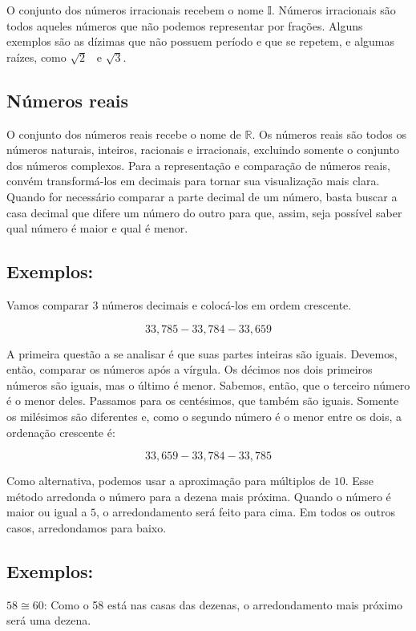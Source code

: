 O conjunto dos números irracionais recebem o nome 𝕀. Números irracionais
são todos aqueles números que não podemos representar por frações.
Alguns exemplos são as dízimas que não possuem período e que se repetem,
e algumas raízes, como $\sqrt{2}$ \ e $\sqrt{3}$.

\subsection{Números reais}

O conjunto dos números reais recebe o nome de $\mathbb{R}$. Os números reais são
todos os números naturais, inteiros, racionais e irracionais, excluindo
somente o conjunto dos números complexos. Para a representação e
comparação de números reais, convém transformá-los em decimais para
tornar sua visualização mais clara. Quando for necessário comparar a
parte decimal de um número, basta buscar a casa decimal que difere um
número do outro para que, assim, seja possível saber qual número é maior
e qual é menor.

\subsection{Exemplos:}

Vamos comparar 3 números decimais e colocá-los em ordem crescente.

$$33,785  - 33,784  - 33,659$$

A primeira questão a se analisar é que suas partes inteiras são iguais.
Devemos, então, comparar os números após a vírgula. Os décimos nos dois
primeiros números são iguais, mas o último é menor. Sabemos, então, que
o terceiro número é o menor deles. Passamos para os centésimos, que
também são iguais. Somente os milésimos são diferentes e, como o segundo
número é o menor entre os dois, a ordenação crescente é:

$$33,659  - 33,784  - 33,785$$

Como alternativa, podemos usar a aproximação para múltiplos de $10$. Esse
método arredonda o número para a dezena mais próxima. Quando o número é
maior ou igual a $5$, o arredondamento será feito para cima. Em todos os
outros casos, arredondamos para baixo.

\subsection{Exemplos:}

$58\cong 60$: Como o 58 está nas casas das dezenas, o
arredondamento mais próximo será uma dezena.

